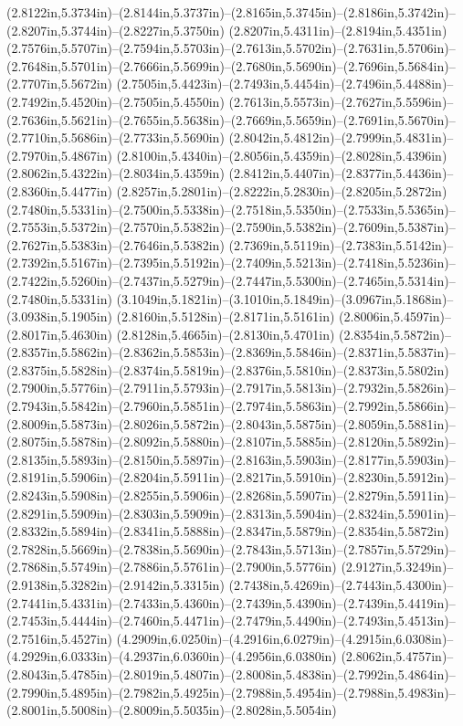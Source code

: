 (2.8122in,5.3734in)--(2.8144in,5.3737in)--(2.8165in,5.3745in)--(2.8186in,5.3742in)--(2.8207in,5.3744in)--(2.8227in,5.3750in) (2.8207in,5.4311in)--(2.8194in,5.4351in) (2.7576in,5.5707in)--(2.7594in,5.5703in)--(2.7613in,5.5702in)--(2.7631in,5.5706in)--(2.7648in,5.5701in)--(2.7666in,5.5699in)--(2.7680in,5.5690in)--(2.7696in,5.5684in)--(2.7707in,5.5672in) (2.7505in,5.4423in)--(2.7493in,5.4454in)--(2.7496in,5.4488in)--(2.7492in,5.4520in)--(2.7505in,5.4550in) (2.7613in,5.5573in)--(2.7627in,5.5596in)--(2.7636in,5.5621in)--(2.7655in,5.5638in)--(2.7669in,5.5659in)--(2.7691in,5.5670in)--(2.7710in,5.5686in)--(2.7733in,5.5690in) (2.8042in,5.4812in)--(2.7999in,5.4831in)--(2.7970in,5.4867in) (2.8100in,5.4340in)--(2.8056in,5.4359in)--(2.8028in,5.4396in) (2.8062in,5.4322in)--(2.8034in,5.4359in) (2.8412in,5.4407in)--(2.8377in,5.4436in)--(2.8360in,5.4477in) (2.8257in,5.2801in)--(2.8222in,5.2830in)--(2.8205in,5.2872in) (2.7480in,5.5331in)--(2.7500in,5.5338in)--(2.7518in,5.5350in)--(2.7533in,5.5365in)--(2.7553in,5.5372in)--(2.7570in,5.5382in)--(2.7590in,5.5382in)--(2.7609in,5.5387in)--(2.7627in,5.5383in)--(2.7646in,5.5382in) (2.7369in,5.5119in)--(2.7383in,5.5142in)--(2.7392in,5.5167in)--(2.7395in,5.5192in)--(2.7409in,5.5213in)--(2.7418in,5.5236in)--(2.7422in,5.5260in)--(2.7437in,5.5279in)--(2.7447in,5.5300in)--(2.7465in,5.5314in)--(2.7480in,5.5331in) (3.1049in,5.1821in)--(3.1010in,5.1849in)--(3.0967in,5.1868in)--(3.0938in,5.1905in) (2.8160in,5.5128in)--(2.8171in,5.5161in) (2.8006in,5.4597in)--(2.8017in,5.4630in) (2.8128in,5.4665in)--(2.8130in,5.4701in) (2.8354in,5.5872in)--(2.8357in,5.5862in)--(2.8362in,5.5853in)--(2.8369in,5.5846in)--(2.8371in,5.5837in)--(2.8375in,5.5828in)--(2.8374in,5.5819in)--(2.8376in,5.5810in)--(2.8373in,5.5802in) (2.7900in,5.5776in)--(2.7911in,5.5793in)--(2.7917in,5.5813in)--(2.7932in,5.5826in)--(2.7943in,5.5842in)--(2.7960in,5.5851in)--(2.7974in,5.5863in)--(2.7992in,5.5866in)--(2.8009in,5.5873in)--(2.8026in,5.5872in)--(2.8043in,5.5875in)--(2.8059in,5.5881in)--(2.8075in,5.5878in)--(2.8092in,5.5880in)--(2.8107in,5.5885in)--(2.8120in,5.5892in)--(2.8135in,5.5893in)--(2.8150in,5.5897in)--(2.8163in,5.5903in)--(2.8177in,5.5903in)--(2.8191in,5.5906in)--(2.8204in,5.5911in)--(2.8217in,5.5910in)--(2.8230in,5.5912in)--(2.8243in,5.5908in)--(2.8255in,5.5906in)--(2.8268in,5.5907in)--(2.8279in,5.5911in)--(2.8291in,5.5909in)--(2.8303in,5.5909in)--(2.8313in,5.5904in)--(2.8324in,5.5901in)--(2.8332in,5.5894in)--(2.8341in,5.5888in)--(2.8347in,5.5879in)--(2.8354in,5.5872in) (2.7828in,5.5669in)--(2.7838in,5.5690in)--(2.7843in,5.5713in)--(2.7857in,5.5729in)--(2.7868in,5.5749in)--(2.7886in,5.5761in)--(2.7900in,5.5776in) (2.9127in,5.3249in)--(2.9138in,5.3282in)--(2.9142in,5.3315in) (2.7438in,5.4269in)--(2.7443in,5.4300in)--(2.7441in,5.4331in)--(2.7433in,5.4360in)--(2.7439in,5.4390in)--(2.7439in,5.4419in)--(2.7453in,5.4444in)--(2.7460in,5.4471in)--(2.7479in,5.4490in)--(2.7493in,5.4513in)--(2.7516in,5.4527in) (4.2909in,6.0250in)--(4.2916in,6.0279in)--(4.2915in,6.0308in)--(4.2929in,6.0333in)--(4.2937in,6.0360in)--(4.2956in,6.0380in) (2.8062in,5.4757in)--(2.8043in,5.4785in)--(2.8019in,5.4807in)--(2.8008in,5.4838in)--(2.7992in,5.4864in)--(2.7990in,5.4895in)--(2.7982in,5.4925in)--(2.7988in,5.4954in)--(2.7988in,5.4983in)--(2.8001in,5.5008in)--(2.8009in,5.5035in)--(2.8028in,5.5054in) 